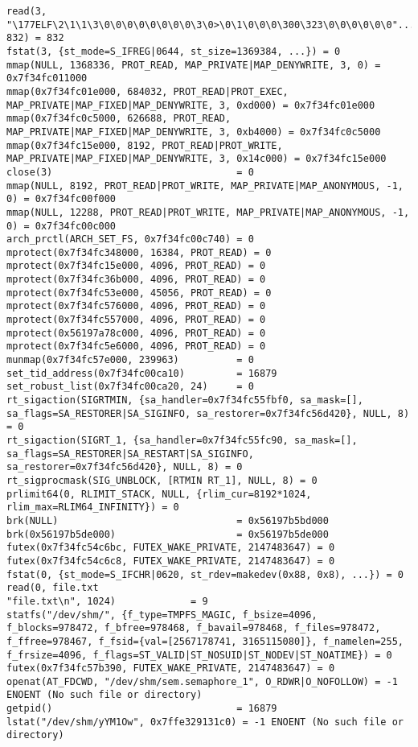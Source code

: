 \documentclass[a4paper, 12pt]{article}
\begin{document}
\begin{lstlisting}
read(3, "\177ELF\2\1\1\3\0\0\0\0\0\0\0\0\3\0>\0\1\0\0\0\300\323\0\0\0\0\0\0"..., 832) = 832
fstat(3, {st_mode=S_IFREG|0644, st_size=1369384, ...}) = 0
mmap(NULL, 1368336, PROT_READ, MAP_PRIVATE|MAP_DENYWRITE, 3, 0) = 0x7f34fc011000
mmap(0x7f34fc01e000, 684032, PROT_READ|PROT_EXEC, MAP_PRIVATE|MAP_FIXED|MAP_DENYWRITE, 3, 0xd000) = 0x7f34fc01e000
mmap(0x7f34fc0c5000, 626688, PROT_READ, MAP_PRIVATE|MAP_FIXED|MAP_DENYWRITE, 3, 0xb4000) = 0x7f34fc0c5000
mmap(0x7f34fc15e000, 8192, PROT_READ|PROT_WRITE, MAP_PRIVATE|MAP_FIXED|MAP_DENYWRITE, 3, 0x14c000) = 0x7f34fc15e000
close(3)                                = 0
mmap(NULL, 8192, PROT_READ|PROT_WRITE, MAP_PRIVATE|MAP_ANONYMOUS, -1, 0) = 0x7f34fc00f000
mmap(NULL, 12288, PROT_READ|PROT_WRITE, MAP_PRIVATE|MAP_ANONYMOUS, -1, 0) = 0x7f34fc00c000
arch_prctl(ARCH_SET_FS, 0x7f34fc00c740) = 0
mprotect(0x7f34fc348000, 16384, PROT_READ) = 0
mprotect(0x7f34fc15e000, 4096, PROT_READ) = 0
mprotect(0x7f34fc36b000, 4096, PROT_READ) = 0
mprotect(0x7f34fc53e000, 45056, PROT_READ) = 0
mprotect(0x7f34fc576000, 4096, PROT_READ) = 0
mprotect(0x7f34fc557000, 4096, PROT_READ) = 0
mprotect(0x56197a78c000, 4096, PROT_READ) = 0
mprotect(0x7f34fc5e6000, 4096, PROT_READ) = 0
munmap(0x7f34fc57e000, 239963)          = 0
set_tid_address(0x7f34fc00ca10)         = 16879
set_robust_list(0x7f34fc00ca20, 24)     = 0
rt_sigaction(SIGRTMIN, {sa_handler=0x7f34fc55fbf0, sa_mask=[], sa_flags=SA_RESTORER|SA_SIGINFO, sa_restorer=0x7f34fc56d420}, NULL, 8) = 0
rt_sigaction(SIGRT_1, {sa_handler=0x7f34fc55fc90, sa_mask=[], sa_flags=SA_RESTORER|SA_RESTART|SA_SIGINFO, sa_restorer=0x7f34fc56d420}, NULL, 8) = 0
rt_sigprocmask(SIG_UNBLOCK, [RTMIN RT_1], NULL, 8) = 0
prlimit64(0, RLIMIT_STACK, NULL, {rlim_cur=8192*1024, rlim_max=RLIM64_INFINITY}) = 0
brk(NULL)                               = 0x56197b5bd000
brk(0x56197b5de000)                     = 0x56197b5de000
futex(0x7f34fc54c6bc, FUTEX_WAKE_PRIVATE, 2147483647) = 0
futex(0x7f34fc54c6c8, FUTEX_WAKE_PRIVATE, 2147483647) = 0
fstat(0, {st_mode=S_IFCHR|0620, st_rdev=makedev(0x88, 0x8), ...}) = 0
read(0, file.txt
"file.txt\n", 1024)             = 9
statfs("/dev/shm/", {f_type=TMPFS_MAGIC, f_bsize=4096, f_blocks=978472, f_bfree=978468, f_bavail=978468, f_files=978472, f_ffree=978467, f_fsid={val=[2567178741, 3165115080]}, f_namelen=255, f_frsize=4096, f_flags=ST_VALID|ST_NOSUID|ST_NODEV|ST_NOATIME}) = 0
futex(0x7f34fc57b390, FUTEX_WAKE_PRIVATE, 2147483647) = 0
openat(AT_FDCWD, "/dev/shm/sem.semaphore_1", O_RDWR|O_NOFOLLOW) = -1 ENOENT (No such file or directory)
getpid()                                = 16879
lstat("/dev/shm/yYM1Ow", 0x7ffe329131c0) = -1 ENOENT (No such file or directory)

\end{lstlisting}
\end{document}
